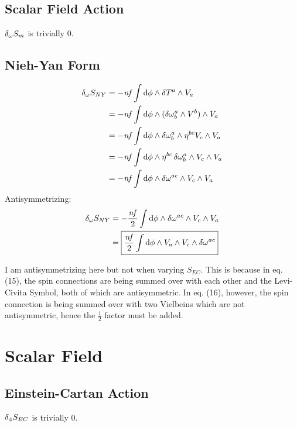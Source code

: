 \documentclass[12pt]{article}
\begin{document}
\subsection{Scalar Field Action}
$\var_\omega{S_m}$ is trivially $0$.

\subsection{Nieh-Yan Form}
\begin{align*}
  \var_\omega{S_{NY}} &= -\mathit{nf} \int \dd{\phi} \wedge \var{T^a} \wedge V_a \\
  &= -\mathit{nf} \int \dd{\phi} \wedge (\var{\omega^a_b} \wedge V^b) \wedge V_a \\
  &= -\mathit{nf} \int \dd{\phi} \wedge \var{\omega^a_b} \wedge \eta^{bc}V_c \wedge V_a \\
  &= -\mathit{nf} \int \dd{\phi} \wedge \eta^{bc}\var{\omega^a_b} \wedge V_c \wedge V_a \\
  &= -\mathit{nf} \int \dd{\phi} \wedge \var{\omega^{ac}} \wedge V_c \wedge V_a \\
\end{align*}
Antisymmetrizing:
\begin{align}
  \var_\omega{S_{NY}} &= -\frac{\mathit{nf}}{2} \int \dd{\phi} \wedge \var{\omega^{ac}} \wedge V_c \wedge V_a \nonumber \\
  &= \boxed{\frac{\mathit{nf}}{2} \int \dd{\phi} \wedge V_a \wedge V_c \wedge \var{\omega^{ac}}}
\end{align}

I am antisymmetrizing here but not when varying $S_{EC}$. This is because in eq. (15), the spin connections are being summed over with each other and the Levi-Civita Symbol, both of which are antisymmetric. In eq. (16), however, the spin connection is being summed over with two Vielbeins which are not antisymmetric, hence the $\frac{1}{2}$ factor must be added.

\section{Scalar Field}
\subsection{Einstein-Cartan Action}
$\var_\phi{S_{EC}}$ is trivially 0.
\end{document}
